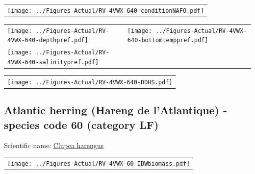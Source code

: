\documentclass[12pt]{article}\usepackage[]{graphicx}\usepackage[]{color}
\begin{document}
\vspace{1cm}
\begin{minipage}{1.0\textwidth}
 \begin{tabular}{c}
\texttt{[image: ../Figures-Actual/RV-4VWX-640-conditionNAFO.pdf]} \\ 
\end{tabular} 
\end{minipage}
\clearpage
\begin{minipage}{1.0\textwidth}
 \begin{tabular}[t]{m{3in}m{3in}}
\texttt{[image: ../Figures-Actual/RV-4VWX-640-depthpref.pdf]} & 
\texttt{[image: ../Figures-Actual/RV-4VWX-640-bottomtemppref.pdf]} \\ 
\texttt{[image: ../Figures-Actual/RV-4VWX-640-salinitypref.pdf]} & 
 \\ 
\end{tabular} 
\end{minipage}
\newline

\vspace{1cm}
\begin{minipage}{1.0\textwidth}
 \begin{tabular}{c}
\texttt{[image: ../Figures-Actual/RV-4VWX-640-DDHS.pdf]} \\ 
\end{tabular} 
\end{minipage}
\clearpage

\renewcommand\thefigure{\thesubsection\Alph{figure}}

\setcounter{figure}{0}

\hypertarget{sec:60}{%
\subsection{Atlantic herring (Hareng de l'Atlantique) - species code 60 (category LF)}\label{sec:60}}

  


Scientific name: \href{http://www.marinespecies.org/aphia.php?p=taxdetails\&id=126417}{Clupea harengus} \newline
\begin{minipage}{1.0\textwidth}
 \begin{tabular}{c}
\texttt{[image: ../Figures-Actual/RV-4VWX-60-IDWbiomass.pdf]} \\ 
\end{tabular} 
\end{minipage}
\newline
\end{document}
